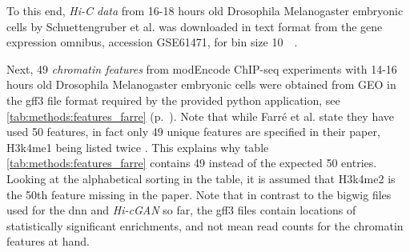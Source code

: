 To this end, \emph{Hi-C data} from 16-18 hours old Drosophila Melanogaster embryonic cells by Schuettengruber et al. \cite{Schuettengruber2014} 
was downloaded in text format from  the gene expression omnibus, accession GSE61471, for bin size \SI{10}{\kilo\bp}.

Next, 49 \emph{chromatin features} from modEncode ChIP-seq experiments with 14-16 hours old Drosophila Melanogaster embryonic cells \cite{Roy2010}
were obtained from GEO in the gff3 file format required by the provided python application, see \cref{tab:methods:features_farre} (p.~\pageref{tab:methods:features_farre}).
Note that while Farr\'e et al. state they have used 50 features, in fact only 49 unique features are specified in their paper, H3k4me1 being listed twice \cite[p.~9]{Farre2018a}.
This explains why table \ref{tab:methods:features_farre} contains 49 instead of the expected 50 entries. 
Looking at the alphabetical sorting in the table, it is assumed that H3k4me2 is the 50th feature missing in the paper.
Note that in contrast to the bigwig files used for the \acrshort{dnn} and \emph{Hi-cGAN} so far, the gff3 files contain locations of statistically significant enrichments,
and not mean read counts for the chromatin features at hand.
